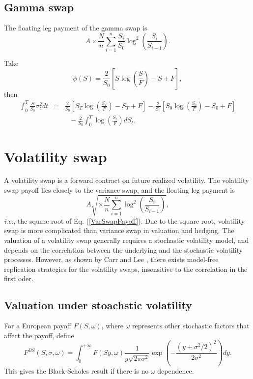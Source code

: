 \documentclass[12pt]{article}
\begin{document}
  \subsection{Gamma swap}

    The floating leg payment of the gamma swap is
    \begin{equation}
      A\times\frac{N}{n}\sum_{i=1}^{n}\frac{S_i}{S_0}\log^2\left(\frac{S_i}{S_{i-1}}\right).
    \end{equation}

    Take
    \begin{equation}
      \phi(S) = \frac{2}{S_0}\left[S\log\left(\frac{S}{F}\right)-S+F\right],
    \end{equation}
    then
    \begin{eqnarray}
      \int_0^T\frac{S}{S_0}\sigma_t^2dt &=& \frac{2}{S_0}\left[S_T\log\left(\frac{S_T}{F}\right)-S_T+F\right]
                                     - \frac{2}{S_0}\left[S_0\log\left(\frac{S_0}{F}\right)-S_0+F\right]\nonumber\\
                            && \ \ \ - \frac{2}{S_0}\int_0^T\log\left(\frac{S_t}{F}\right)dS_t.
    \end{eqnarray}


\section{Volatility swap}

  A volatility swap is a forward contract on future realized volatility.  The volatility swap payoff lies closely
  to the variance swap, and the floating leg payment is
  \begin{equation}
    A\sqrt{\times\frac{N}{n}\sum_{i=1}^{n}\log^2\left(\frac{S_i}{S_{i-1}}\right)},
  \end{equation}
  {\it i.e.}, the square root of Eq. (\ref{VarSwapPayoff}). Due to the square root, volatility swap is more complicated
  than variance swap in valuation and hedging. The valuation of a volatility swap generally requires a stochastic volatility
  model, and depends on the correlation between the underlying and the stochastic volatility processes. However, as shown by
  Carr and Lee \cite{CarrLee2}, there exists model-free replication strategies for the volatility swaps, insensitive to the correlation in
  the first oder.

  \subsection{Valuation under stoachstic volatility}
    For a European payoff $F(S,\omega)$, where $\omega$ represents other stochastic factors that affect the payoff,
    define
    \begin{equation}
      F^{BS}\left(S, \sigma, \omega\right) = \int_0^{+\infty}F(Sy,\omega)
                          \frac{1}{y\sqrt{2\pi\sigma^2}}\exp\left(-\frac{\left(y+\sigma^2/2\right)^2}{2\sigma^2}\right)dy.
    \end{equation}
    This gives the Black-Scholes result if there is no $\omega$ dependence.
\end{document}
